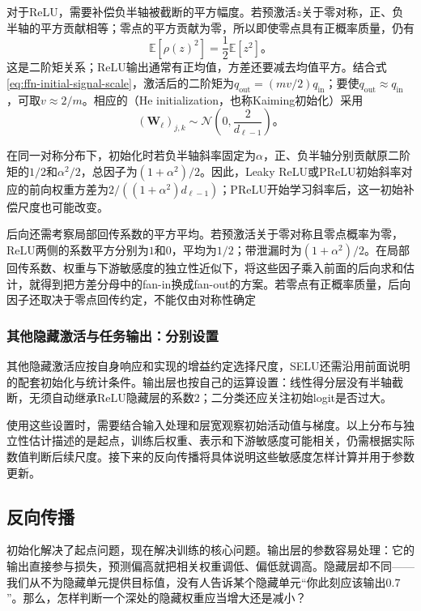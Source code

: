 对于ReLU，需要补偿负半轴被截断的平方幅度。若预激活$z$关于零对称，正、负半轴的平方贡献相等；零点的平方贡献为零，所以即使零点具有正概率质量，仍有
\[
  \mathbb{E}[\rho(z)^2]=\frac12\mathbb{E}[z^2]\text{。}
\]
这是二阶矩关系；ReLU输出通常有正均值，方差还要减去均值平方。结合式\eqref{eq:ffn-initial-signal-scale}，激活后的二阶矩为$q_{\mathrm{out}}=(m v/2)q_{\mathrm{in}}$；要使$q_{\mathrm{out}}\approx q_{\mathrm{in}}$，可取$v\approx2/m$。相应的（He initialization，也称Kaiming初始化）采用
\begin{equation}
  (\bm{W}_\ell)_{j,k}\sim
  \mathcal{N}\!\left(0,\frac{2}{d_{\ell-1}}\right)\text{。}
  \label{eq:ffn-he-initialization}
\end{equation}

在同一对称分布下，初始化时若负半轴斜率固定为$\alpha$，正、负半轴分别贡献原二阶矩的$1/2$和$\alpha^2/2$，总因子为$(1+\alpha^2)/2$。因此，Leaky ReLU或PReLU初始斜率对应的前向权重方差为$2/((1+\alpha^2)d_{\ell-1})$；PReLU开始学习斜率后，这一初始补偿尺度也可能改变。

后向还需考察局部回传系数的平方平均。若预激活关于零对称且零点概率为零，ReLU两侧的系数平方分别为$1$和$0$，平均为$1/2$；带泄漏时为$(1+\alpha^2)/2$。在局部回传系数、权重与下游敏感度的独立性近似下，将这些因子乘入前面的后向求和估计，就得到把方差分母中的fan-in换成fan-out的方案。若零点有正概率质量，后向因子还取决于零点回传约定，不能仅由对称性确定

\subsubsection{其他隐藏激活与任务输出：分别设置}
\label{sec:ffn-initialization-other}

其他隐藏激活应按自身响应和实现的增益约定选择尺度，SELU还需沿用前面说明的配套初始化与统计条件。输出层也按自己的运算设置：线性得分层没有半轴截断，无须自动继承ReLU隐藏层的系数$2$；二分类还应关注初始logit是否过大。

使用这些设置时，需要结合输入处理和层宽观察初始活动值与梯度。以上分布与独立性估计描述的是起点，训练后权重、表示和下游敏感度可能相关，仍需根据实际数值判断后续尺度。接下来的反向传播将具体说明这些敏感度怎样计算并用于参数更新。

\subsection{反向传播}
\label{sec:ffn-backpropagation}

初始化解决了起点问题，现在解决训练的核心问题。输出层的参数容易处理：它的输出直接参与损失，预测偏高就把相关权重调低、偏低就调高。隐藏层却不同——我们从不为隐藏单元提供目标值，没有人告诉某个隐藏单元“你此刻应该输出$0.7$”。那么，怎样判断一个深处的隐藏权重应当增大还是减小？

